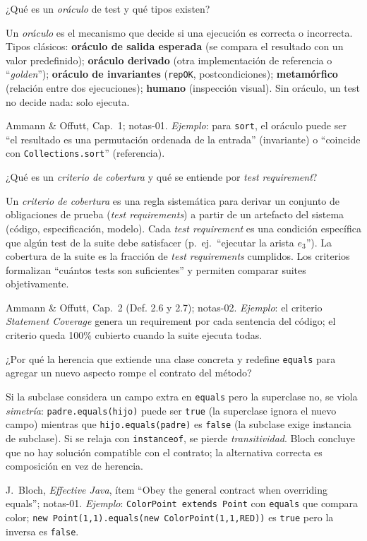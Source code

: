 \documentclass[11pt,a4paper]{article}
\newcounter{preg}
\newcommand{\qa}[3]{%
  \stepcounter{preg}%
  \vspace{0.4em}
  \begin{preguntabox}{\thepreg}
  #1
  \end{preguntabox}
  \begin{respuestabox}
  #2
  \end{respuestabox}
  \begin{refbox}
  #3
  \end{refbox}
  \vspace{0.6em}
}
\begin{document}
\qa{¿Qué es un \emph{oráculo} de test y qué tipos existen?}
{Un \emph{oráculo} es el mecanismo que decide si una ejecución es correcta o incorrecta. Tipos clásicos: \textbf{oráculo de salida esperada} (se compara el resultado con un valor predefinido); \textbf{oráculo derivado} (otra implementación de referencia o ``\emph{golden}''); \textbf{oráculo de invariantes} (\texttt{repOK}, postcondiciones); \textbf{metamórfico} (relación entre dos ejecuciones); \textbf{humano} (inspección visual). Sin oráculo, un test no decide nada: solo ejecuta.}
{Ammann \& Offutt, Cap.~1; notas-01. \emph{Ejemplo}: para \texttt{sort}, el oráculo puede ser ``el resultado es una permutación ordenada de la entrada'' (invariante) o ``coincide con \texttt{Collections.sort}'' (referencia).}

\qa{¿Qué es un \emph{criterio de cobertura} y qué se entiende por \emph{test requirement}?}
{Un \emph{criterio de cobertura} es una regla sistemática para derivar un conjunto de obligaciones de prueba (\emph{test requirements}) a partir de un artefacto del sistema (código, especificación, modelo). Cada \emph{test requirement} es una condición específica que algún test de la suite debe satisfacer (p.~ej.\ ``ejecutar la arista $e_3$''). La cobertura de la suite es la fracción de \emph{test requirements} cumplidos. Los criterios formalizan ``cuántos tests son suficientes'' y permiten comparar suites objetivamente.}
{Ammann \& Offutt, Cap.~2 (Def. 2.6 y 2.7); notas-02. \emph{Ejemplo}: el criterio \emph{Statement Coverage} genera un requirement por cada sentencia del código; el criterio queda 100\% cubierto cuando la suite ejecuta todas.}

\qa{¿Por qué la herencia que extiende una clase concreta y redefine \texttt{equals} para agregar un nuevo aspecto rompe el contrato del método?}
{Si la subclase considera un campo extra en \texttt{equals} pero la superclase no, se viola \emph{simetría}: \texttt{padre.equals(hijo)} puede ser \texttt{true} (la superclase ignora el nuevo campo) mientras que \texttt{hijo.equals(padre)} es \texttt{false} (la subclase exige instancia de subclase). Si se relaja con \texttt{instanceof}, se pierde \emph{transitividad}. Bloch concluye que no hay solución compatible con el contrato; la alternativa correcta es composición en vez de herencia.}
{J.~Bloch, \emph{Effective Java}, ítem ``Obey the general contract when overriding equals''; notas-01. \emph{Ejemplo}: \texttt{ColorPoint extends Point} con \texttt{equals} que compara color; \texttt{new Point(1,1).equals(new ColorPoint(1,1,RED))} es \texttt{true} pero la inversa es \texttt{false}.}
\end{document}
